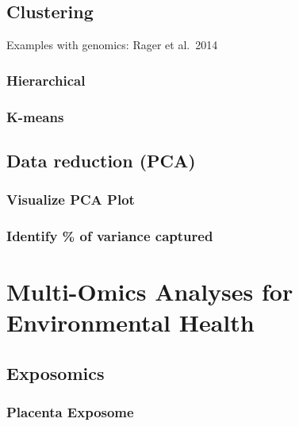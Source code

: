 \documentclass[
]{book}
\begin{document}
\hypertarget{clustering}{%
\section{Clustering}\label{clustering}}

Examples with genomics: Rager et al.~2014

\hypertarget{hierarchical}{%
\subsection{Hierarchical}\label{hierarchical}}

\hypertarget{k-means}{%
\subsection{K-means}\label{k-means}}

\hypertarget{data-reduction-pca}{%
\section{Data reduction (PCA)}\label{data-reduction-pca}}

\hypertarget{visualize-pca-plot}{%
\subsection{Visualize PCA Plot}\label{visualize-pca-plot}}

\hypertarget{identify-of-variance-captured}{%
\subsection{Identify \% of variance captured}\label{identify-of-variance-captured}}

\hypertarget{multi-omics-analyses-for-environmental-health}{%
\chapter{Multi-Omics Analyses for Environmental Health}\label{multi-omics-analyses-for-environmental-health}}

\hypertarget{exposomics}{%
\section{Exposomics}\label{exposomics}}

\hypertarget{placenta-exposome}{%
\subsection{Placenta Exposome}\label{placenta-exposome}}
\end{document}
